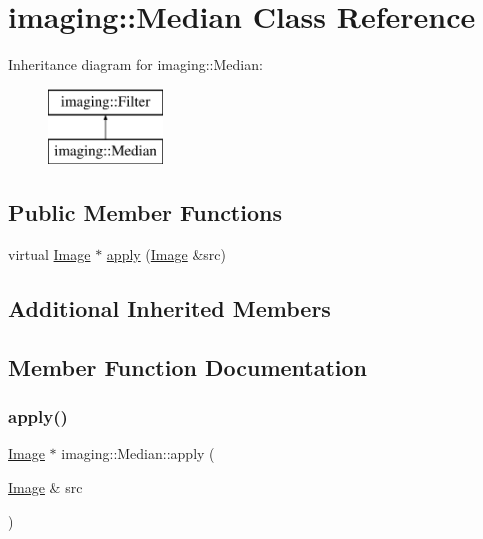\hypertarget{classimaging_1_1_median}{}\section{imaging\+:\+:Median Class Reference}
\label{classimaging_1_1_median}
Inheritance diagram for imaging\+:\+:Median\+:\begin{figure}[H]
\begin{center}
\leavevmode
\includegraphics[height=2.000000cm]{classimaging_1_1_median}
\end{center}
\end{figure}
\subsection*{Public Member Functions}
\begin{DoxyCompactItemize}
\item 
virtual \hyperlink{classimaging_1_1_image}{Image} $\ast$ \hyperlink{classimaging_1_1_median_a9b6e9ac628f71aaad3e7b668832e5a10}{apply} (\hyperlink{classimaging_1_1_image}{Image} \&src)
\end{DoxyCompactItemize}
\subsection*{Additional Inherited Members}


\subsection{Member Function Documentation}
\mbox{\label{classimaging_1_1_median_a9b6e9ac628f71aaad3e7b668832e5a10}} 
\subsubsection{\texorpdfstring{apply()}{apply()}}
{\footnotesize\ttfamily \hyperlink{classimaging_1_1_image}{Image} $\ast$ imaging\+::\+Median\+::apply (\begin{DoxyParamCaption}\item[{\hyperlink{classimaging_1_1_image}{Image} \&}]{src }\end{DoxyParamCaption})\hspace{0.3cm}{\ttfamily [virtual]}}

